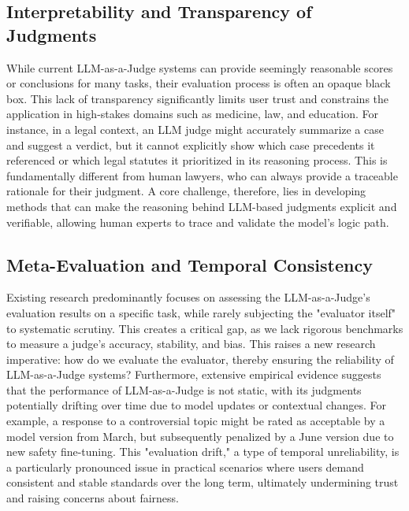 \documentclass[acmsmall,screen]{acmart}
\begin{document}
\subsection{Interpretability and Transparency of Judgments}\label{subsec:challenges_interpretability}

While current LLM-as-a-Judge systems can provide seemingly reasonable scores or conclusions for many tasks, their evaluation process is often an opaque black box. This lack of transparency significantly limits user trust and constrains the application in high-stakes domains such as medicine, law, and education. For instance, in a legal context, an LLM judge might accurately summarize a case and suggest a verdict, but it cannot explicitly show which case precedents it referenced or which legal statutes it prioritized in its reasoning process. This is fundamentally different from human lawyers, who can always provide a traceable rationale for their judgment. A core challenge, therefore, lies in developing methods that can make the reasoning behind LLM-based judgments explicit and verifiable, allowing human experts to trace and validate the model's logic path.

\subsection{Meta-Evaluation and Temporal Consistency}\label{subsec:challenges_meta_eval}

Existing research predominantly focuses on assessing the LLM-as-a-Judge's evaluation results on a specific task, while rarely subjecting the "evaluator itself" to systematic scrutiny. This creates a critical gap, as we lack rigorous benchmarks to measure a judge's accuracy, stability, and bias. This raises a new research imperative: how do we evaluate the evaluator, thereby ensuring the reliability of LLM-as-a-Judge systems? Furthermore, extensive empirical evidence suggests that the performance of LLM-as-a-Judge is not static, with its judgments potentially drifting over time due to model updates or contextual changes. For example, a response to a controversial topic might be rated as acceptable by a model version from March, but subsequently penalized by a June version due to new safety fine-tuning. This "evaluation drift," a type of temporal unreliability, is a particularly pronounced issue in practical scenarios where users demand consistent and stable standards over the long term, ultimately undermining trust and raising concerns about fairness.
\end{document}
